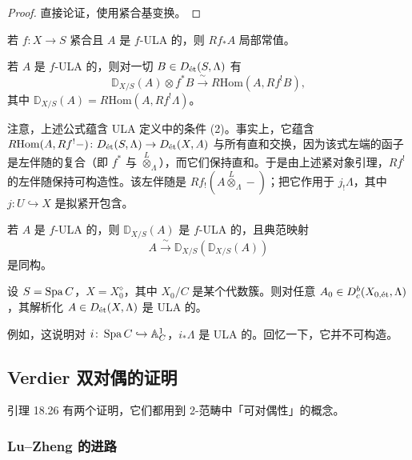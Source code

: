
\begin{proof}
直接论证，使用紧合基变换。
\end{proof}

\begin{corollary}
若 $f\colon X\to S$ 紧合且 $A$ 是 $f$-ULA 的，则 $Rf_*A$ 局部常值。
\end{corollary}

\begin{lemma}[扭曲 Verdier 对偶]
若 $A$ 是 $f$-ULA 的，则对一切 $B\in D_{\et}(S,\Lambda)$ 有
\[
\mathbb{D}_{X/S}(A)\otimes f^*B\xrightarrow{\ \sim\ }R\mathrm{Hom}(A,Rf^!B),
\]
其中 $\mathbb{D}_{X/S}(A)=R\mathrm{Hom}(A,Rf^!\Lambda)$。
\end{lemma}

注意，上述公式蕴含 ULA 定义中的条件 (2)。事实上，它蕴含 $R\mathrm{Hom}(A,Rf^!-)\colon D_{\et}(S,\Lambda)\to D_{\et}(X,A)$ 与所有直和交换，因为该式左端的函子是左伴随的复合（即 $f^*$ 与 $\overset{L}{\otimes}_\Lambda$），而它们保持直和。于是由上述紧对象引理，$Rf^!$ 的左伴随保持可构造性。该左伴随是 $Rf_!(A\overset{L}{\otimes}_\Lambda-)$；把它作用于 $j_!\Lambda$，其中 $j\colon U\hookrightarrow X$ 是拟紧开包含。

\begin{lemma}
若 $A$ 是 $f$-ULA 的，则 $\mathbb{D}_{X/S}(A)$ 是 $f$-ULA 的，且典范映射
\[
A\xrightarrow{\ \sim\ }\mathbb{D}_{X/S}(\mathbb{D}_{X/S}(A))
\]
是同构。
\end{lemma}

\begin{example}
设 $S=\Spa C$，$X=X_0^\diamond$，其中 $X_0/C$ 是某个代数簇。则对任意 $A_0\in D^b_c(X_{0,\et},\Lambda)$，其解析化 $A\in D_{\et}(X,\Lambda)$ 是 ULA 的。

例如，这说明对 $i\colon\Spa C\hookrightarrow\mathbb A^1_C$，$i_*\Lambda$ 是 ULA 的。回忆一下，它并不可构造。
\end{example}

\subsection{Verdier 双对偶的证明}

引理 18.26 有两个证明，它们都用到 2-范畴中「可对偶性」的概念。

\subsubsection{Lu--Zheng 的进路}

